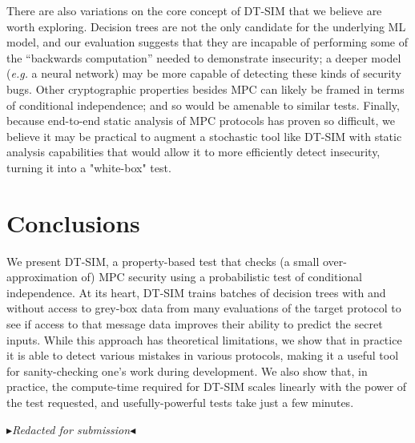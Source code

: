 \documentclass[acmlarge, manuscript, screen, review, anonymous, table]{acmart}
\newcommand{\eg}{\textit{e.g.}\xspace}
\newcommand{\toolname}{\textsc{DT-SIM}\xspace}
\newcommand{\mynote}[2]
    {{\color{red} \fbox{\bfseries\sffamily\scriptsize#1}
    {\small$\blacktriangleright$\textsf{\emph{#2}}$\blacktriangleleft$}}~}
\newcommand{\todo}[1]{\mynote{TODO}{#1}}
\begin{document}
There are also variations on the core concept of \toolname that we believe are worth exploring.
Decision trees are not the only candidate for the underlying ML model, and our evaluation suggests that they are incapable of performing some of the ``backwards computation'' needed to demonstrate insecurity;
a deeper model (\eg a neural network) may be more capable of detecting these kinds of security bugs.
Other cryptographic properties besides MPC can likely be framed in terms of conditional independence;
and so would be amenable to similar tests.
Finally, because end-to-end static analysis of MPC protocols has proven so difficult,
we believe it may be practical to augment a stochastic tool like \toolname with static analysis capabilities
that would allow it to more efficiently detect insecurity, turning it into a "white-box" test.


\section{Conclusions}

We present \toolname,
a property-based test that checks (a small over-approximation of) MPC security
using a probabilistic test of conditional independence.
At its heart, \toolname trains batches of decision trees with and without access to grey-box data from many evaluations of the target protocol
to see if access to that message data improves their ability to predict the secret inputs.
While this approach has theoretical limitations, we show that in practice it is able to detect various mistakes in various protocols,
making it a useful tool for sanity-checking one's work during development.
We also show that, in practice, the compute-time required for \toolname scales linearly with the power of the test requested,
and usefully-powerful tests take just a few minutes.

\begin{acks}
    \todo{Redacted for submission}
\end{acks}





\appendix
\end{document}
